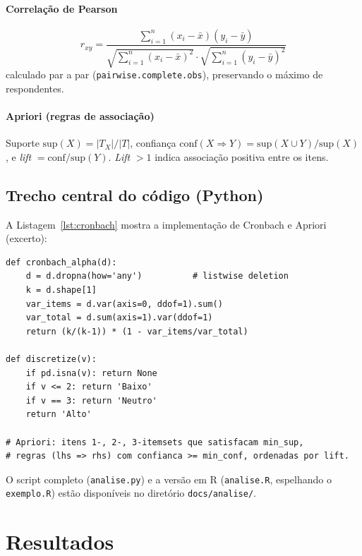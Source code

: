 \documentclass[12pt,a4paper]{article}
\begin{document}
\paragraph{Correlação de Pearson}
\[
r_{xy} = \frac{\sum_{i=1}^{n}(x_i - \bar{x})(y_i - \bar{y})}
{\sqrt{\sum_{i=1}^{n}(x_i - \bar{x})^{2}} \cdot \sqrt{\sum_{i=1}^{n}(y_i - \bar{y})^{2}}}
\]
calculado par a par (\texttt{pairwise.complete.obs}), preservando o máximo de respondentes.

\paragraph{Apriori (regras de associação)}
Suporte $\text{sup}(X) = |T_X|/|T|$, confiança
$\text{conf}(X \Rightarrow Y) = \text{sup}(X \cup Y)/\text{sup}(X)$,
e \emph{lift} $= \text{conf}/\text{sup}(Y)$. \emph{Lift} $>1$ indica associação
positiva entre os itens.

\subsection{Trecho central do código (Python)}
A Listagem~\ref{lst:cronbach} mostra a implementação de Cronbach e Apriori (excerto):

\begin{lstlisting}[style=pystyle, caption={Núcleo do pipeline (\texttt{analise.py}).}, label=lst:cronbach]
def cronbach_alpha(d):
    d = d.dropna(how='any')          # listwise deletion
    k = d.shape[1]
    var_items = d.var(axis=0, ddof=1).sum()
    var_total = d.sum(axis=1).var(ddof=1)
    return (k/(k-1)) * (1 - var_items/var_total)

def discretize(v):
    if pd.isna(v): return None
    if v <= 2: return 'Baixo'
    if v == 3: return 'Neutro'
    return 'Alto'

# Apriori: itens 1-, 2-, 3-itemsets que satisfacam min_sup,
# regras (lhs => rhs) com confianca >= min_conf, ordenadas por lift.
\end{lstlisting}

O script completo (\texttt{analise.py}) e a versão em R (\texttt{analise.R}, espelhando
o \texttt{exemplo.R}) estão disponíveis no diretório \texttt{docs/analise/}.

\section{Resultados}
\label{sec:resultados}
\end{document}
